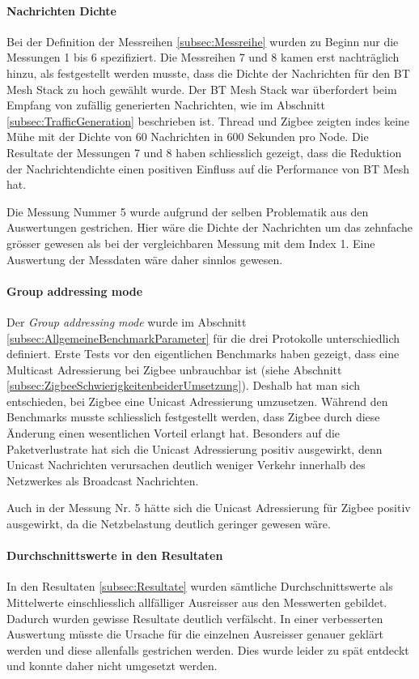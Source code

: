 \paragraph{Nachrichten Dichte}
Bei der Definition der Messreihen \ref{subsec:Messreihe} wurden zu Beginn nur die Messungen 1 bis 6 spezifiziert.
Die Messreihen 7 und 8 kamen erst nachträglich hinzu, als festgestellt werden musste, dass die Dichte der Nachrichten für den BT Mesh Stack zu hoch gewählt wurde.
Der BT Mesh Stack war überfordert beim Empfang von zufällig generierten Nachrichten, wie im Abschnitt \ref{subsec:TrafficGeneration} beschrieben ist.
Thread und Zigbee zeigten indes keine Mühe mit der Dichte von 60 Nachrichten in 600 Sekunden pro Node.
Die Resultate der Messungen 7 und 8 haben schliesslich gezeigt, dass die Reduktion der Nachrichtendichte einen positiven Einfluss auf die Performance von BT Mesh hat.

Die Messung Nummer 5 wurde aufgrund der selben Problematik aus den Auswertungen gestrichen. 
Hier wäre die Dichte der Nachrichten um das zehnfache grösser gewesen als bei der vergleichbaren Messung mit dem Index 1.
Eine Auswertung der Messdaten wäre daher sinnlos gewesen.

\paragraph{Group addressing mode}
Der \textit{Group addressing mode} wurde im Abschnitt \ref{subsec:AllgemeineBenchmarkParameter} für die drei Protokolle unterschiedlich definiert.
Erste Tests vor den eigentlichen Benchmarks haben gezeigt, dass eine Multicast Adressierung bei Zigbee unbrauchbar ist (siehe Abschnitt \ref{subsec:ZigbeeSchwierigkeitenbeiderUmsetzung}).
Deshalb hat man sich entschieden, bei Zigbee eine Unicast Adressierung umzusetzen.
Während den Benchmarks musste schliesslich festgestellt werden, dass Zigbee durch diese Änderung einen wesentlichen Vorteil erlangt hat.
Besonders auf die Paketverlustrate hat sich die Unicast Adressierung positiv ausgewirkt, denn Unicast Nachrichten verursachen deutlich weniger Verkehr innerhalb des Netzwerkes als Broadcast Nachrichten.

Auch in der Messung Nr. 5 hätte sich die Unicast Adressierung für Zigbee positiv ausgewirkt, da die Netzbelastung deutlich geringer gewesen wäre.
 
\paragraph{Durchschnittswerte in den Resultaten}
In den Resultaten \ref{subsec:Resultate} wurden sämtliche Durchschnittswerte als Mittelwerte einschliesslich allfälliger Ausreisser aus den Messwerten gebildet.
Dadurch wurden gewisse Resultate deutlich verfälscht.
In einer verbesserten Auswertung müsste die Ursache für die einzelnen Ausreisser genauer geklärt werden und diese allenfalls gestrichen werden.
Dies wurde leider zu spät entdeckt und konnte daher nicht umgesetzt werden.


